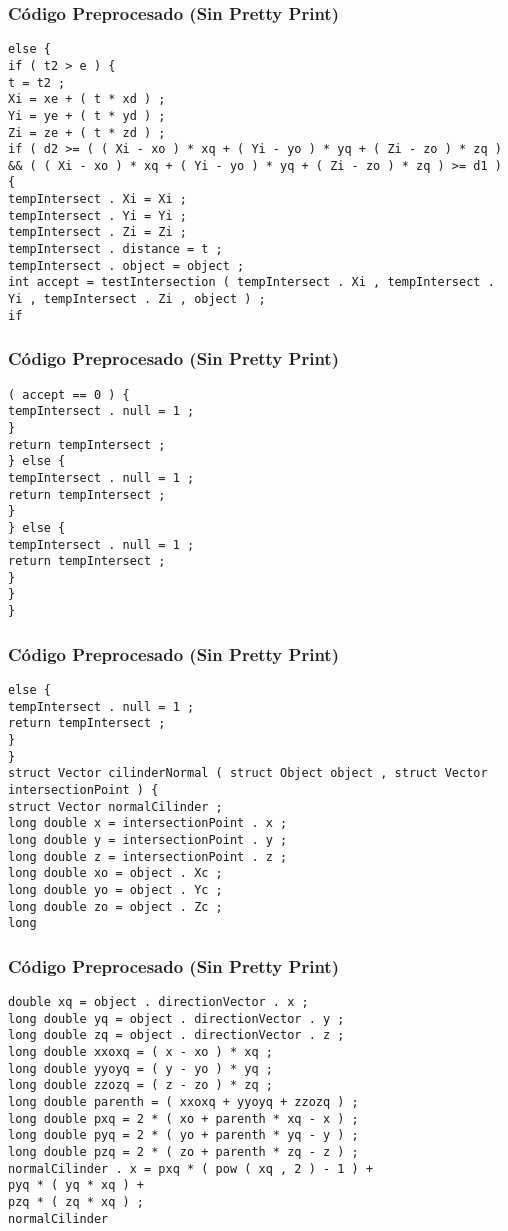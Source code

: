 \documentclass{beamer}
\begin{document}
\begin{frame}[fragile]
\frametitle{C\'odigo Preprocesado (Sin Pretty Print)}
\begin{lstlisting}[style=CStyle]
else { 
if ( t2 > e ) { 
t = t2 ; 
Xi = xe + ( t * xd ) ; 
Yi = ye + ( t * yd ) ; 
Zi = ze + ( t * zd ) ; 
if ( d2 >= ( ( Xi - xo ) * xq + ( Yi - yo ) * yq + ( Zi - zo ) * zq ) && ( ( Xi - xo ) * xq + ( Yi - yo ) * yq + ( Zi - zo ) * zq ) >= d1 ) { 
tempIntersect . Xi = Xi ; 
tempIntersect . Yi = Yi ; 
tempIntersect . Zi = Zi ; 
tempIntersect . distance = t ; 
tempIntersect . object = object ; 
int accept = testIntersection ( tempIntersect . Xi , tempIntersect . Yi , tempIntersect . Zi , object ) ; 
if \end{lstlisting}
\end{frame}
\begin{frame}[fragile]
\frametitle{C\'odigo Preprocesado (Sin Pretty Print)}
\begin{lstlisting}[style=CStyle]
( accept == 0 ) { 
tempIntersect . null = 1 ; 
} 
return tempIntersect ; 
} else { 
tempIntersect . null = 1 ; 
return tempIntersect ; 
} 
} else { 
tempIntersect . null = 1 ; 
return tempIntersect ; 
} 
} 
} \end{lstlisting}
\end{frame}
\begin{frame}[fragile]
\frametitle{C\'odigo Preprocesado (Sin Pretty Print)}
\begin{lstlisting}[style=CStyle]
else { 
tempIntersect . null = 1 ; 
return tempIntersect ; 
} 
} 
struct Vector cilinderNormal ( struct Object object , struct Vector intersectionPoint ) { 
struct Vector normalCilinder ; 
long double x = intersectionPoint . x ; 
long double y = intersectionPoint . y ; 
long double z = intersectionPoint . z ; 
long double xo = object . Xc ; 
long double yo = object . Yc ; 
long double zo = object . Zc ; 
long \end{lstlisting}
\end{frame}
\begin{frame}[fragile]
\frametitle{C\'odigo Preprocesado (Sin Pretty Print)}
\begin{lstlisting}[style=CStyle]
double xq = object . directionVector . x ; 
long double yq = object . directionVector . y ; 
long double zq = object . directionVector . z ; 
long double xxoxq = ( x - xo ) * xq ; 
long double yyoyq = ( y - yo ) * yq ; 
long double zzozq = ( z - zo ) * zq ; 
long double parenth = ( xxoxq + yyoyq + zzozq ) ; 
long double pxq = 2 * ( xo + parenth * xq - x ) ; 
long double pyq = 2 * ( yo + parenth * yq - y ) ; 
long double pzq = 2 * ( zo + parenth * zq - z ) ; 
normalCilinder . x = pxq * ( pow ( xq , 2 ) - 1 ) + 
pyq * ( yq * xq ) + 
pzq * ( zq * xq ) ; 
normalCilinder \end{lstlisting}
\end{frame}
\end{document}
